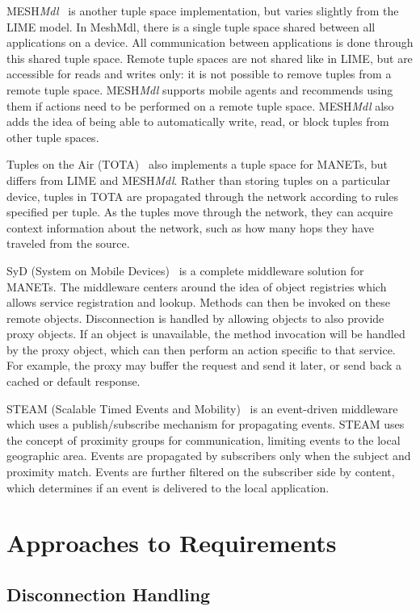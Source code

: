 \documentclass{sig-alternate}
\begin{document}
MESH\textit{Mdl}~\cite{meshmdl}  is another tuple space implementation, but varies slightly from the LIME model. In MeshMdl, there is a single tuple space shared between all applications on a device. All communication between applications is done through this shared tuple space. Remote tuple spaces are not shared like in LIME, but are accessible for reads and writes only: it is not possible to remove tuples from a remote tuple space. MESH\textit{Mdl} supports mobile agents and recommends using them if actions need to be performed on a remote tuple space. MESH\textit{Mdl} also adds the idea of being able to automatically write, read, or block tuples from other tuple spaces.

Tuples on the Air (TOTA)~\cite{tota}  also implements a tuple space for MANETs, but differs from LIME and MESH\textit{Mdl}. Rather than storing tuples on a particular device, tuples in TOTA are propagated through the network according to rules specified per tuple. As the tuples move through the network, they can acquire context information about the network, such as how many hops they have traveled from the source.

SyD (System on Mobile Devices)~\cite{syd} is a complete middleware solution for MANETs. The middleware centers around the idea of object registries which allows service registration and lookup. Methods can then be invoked on these remote objects. Disconnection is handled by allowing objects to also provide proxy objects. If an object is unavailable, the method invocation will be handled by the proxy object, which can then perform an action specific to that service. For example, the proxy may buffer the request and send it later, or send back a cached or default response.

STEAM (Scalable Timed Events and Mobility)~\cite{steam} is an event-driven middleware which uses a publish/subscribe\cite{pubsubsurvey} mechanism for propagating events. STEAM uses the concept of proximity groups for communication, limiting events to the local geographic area. Events are propagated by subscribers only when the subject and proximity match. Events are further filtered on the subscriber side by content, which determines if an event is delivered to the local application.

\section{Approaches to Requirements}

\subsection{Disconnection Handling}
\end{document}
